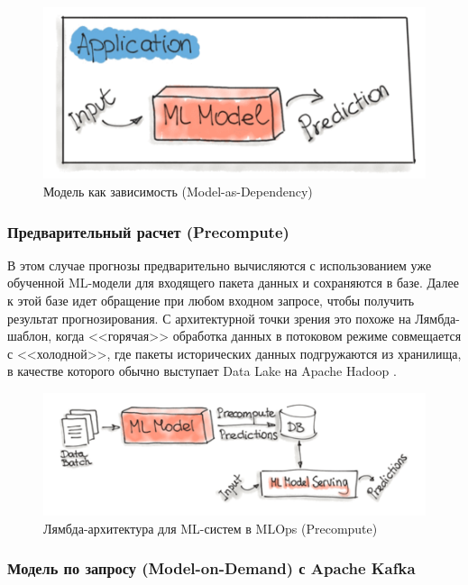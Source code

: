 \documentclass[%
	11pt,
	a4paper,
	utf8,
		]{article}
\begin{document}
\begin{figure}[h]
	\centering
	\includegraphics[scale=0.6]{figures/ml_as_dependency.png}
	\caption{ Модель как зависимость (Model-as-Dependency) }\label{fig:ml_as_dependency}
\end{figure}

\subsubsection{Предварительный расчет (Precompute)}

В этом случае прогнозы предварительно вычисляются с использованием уже обученной ML-модели для входящего пакета данных и сохраняются в базе. Далее к этой базе идет обращение при любом входном запросе, чтобы получить результат прогнозирования. С архитектурной точки зрения это похоже на Лямбда-шаблон, когда <<горячая>> обработка данных в потоковом режиме совмещается с <<холодной>>, где пакеты исторических данных подгружаются из хранилища, в качестве которого обычно выступает Data Lake на Apache Hadoop .

 \begin{figure}[h]
 	\centering
 	\includegraphics[scale=0.6]{figures/precompute.png}
 	\caption{ Лямбда-архитектура для ML-систем в MLOps (Precompute) }\label{fig:precompute}
 \end{figure}

\subsubsection{Модель по запросу (Model-on-Demand) с Apache Kafka}
\end{document}
